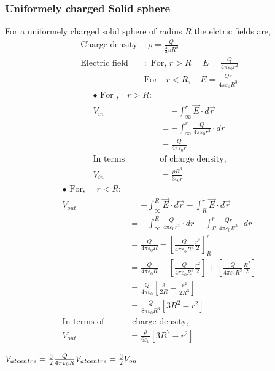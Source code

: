 \subsubsection{Uniformely charged Solid sphere}
For a uniformely charged solid sphere of radius $R$ the elctric fields are,
\begin{align*}
	\text{Charge density}&:\rho=\frac{Q}{\frac{4}{3} \pi R^{3}}\\
	\text{Electric field}&:\text { For, } r>R=E=\frac{Q}{4 \pi \varepsilon_{0} r^{2}}
	\\&\text {For}\quad r<R, \quad E=\frac{Qr}{4 \pi \varepsilon_{0} R^{3}}
	\end{align*}
 \begin{align*}
	\bullet\text { For ,}\quad r>R:\\
	V_{in}&=-\int_{\infty}^{r} \vec{E}\cdot d \vec{r}\\
	&=-\int_{\infty}^{r} \frac{Q}{4 \pi \varepsilon_{0} r^{2}}\cdot d {r}\\
	&=\frac{Q}{4 \pi \varepsilon_{0} r}\\
	\text{In terms }&\text{of charge density,}\\
	V_{in}&=\frac{\rho R^{3}}{3\epsilon_{0} r}
\end{align*}
 \begin{align*}
	\bullet	\text { For, } \quad r<R:\\
	V_{out}&=-\int_{\infty}^{R} \vec{E}\cdot d \vec{r}-\int_{R}^{r} \vec{E}\cdot d \vec{r}\\
	&=-\int_{\infty}^{R} \frac{Q}{4 \pi \varepsilon_{0} r^{2}}\cdot d {r}-\int_{R}^{r} \frac{Qr}{4 \pi \varepsilon_{0} R^{3}} \cdot d {r}\\
	&=\frac{Q}{4 \pi \varepsilon_{0} R}-\left[\frac{Q }{4 \pi \varepsilon_{0} R^{3}} \frac{r^{2}}{2} \right]_{R}^{r}\\
		&=\frac{Q}{4 \pi \varepsilon_{0} R}-\left[\frac{Q }{4 \pi \varepsilon_{0} R^{3}} \frac{r^{2}}{2} \right]+\left[\frac{Q }{4 \pi \varepsilon_{0} R^{3}} \frac{R^{2}}{2} \right]\\ 
		&=\frac{Q }{4 \pi \varepsilon_{0}}\left[\frac{3}{2R}-\frac{r^{2}}{2R^{3}} \right]\\ 
		&=\frac{Q }{8 \pi \varepsilon_{0}R^{3}}\left[3R^{2}-r^{2} \right]\\
	\text{In terms of}&\text{ charge density,}\\
	V_{out}&=\frac{\rho }{6  \varepsilon_{0}}\left[3R^{2}-r^{2} \right]
\end{align*}
\begin{note}
$	V_{at centre}=\frac{3}{2}\frac{Q}{4 \pi \varepsilon_{0} R}\\
	V_{at centre}=\frac{3}{2}V_{on}$
\end{note}
